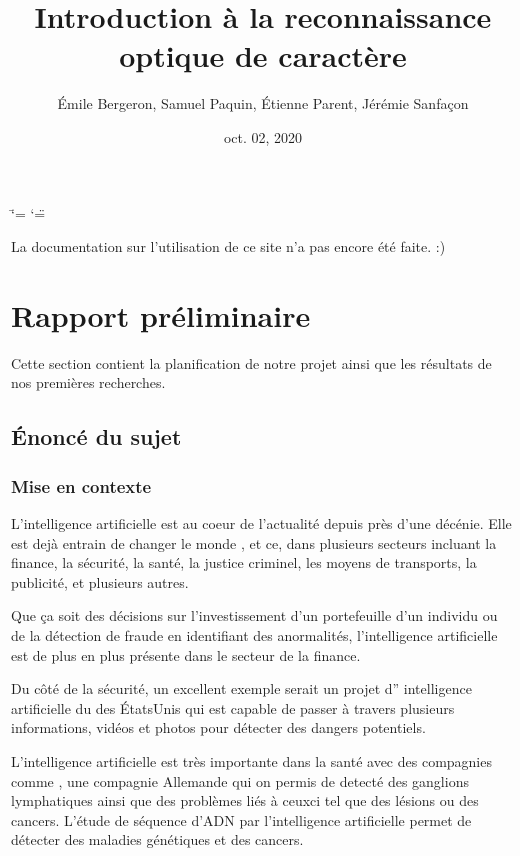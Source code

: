 \documentclass[letterpaper,10pt,french]{sphinxmanual}
\title{Introduction à la reconnaissance optique de caractère}
\date{oct. 02, 2020}
\author{Émile Bergeron, Samuel Paquin, Étienne Parent, Jérémie Sanfaçon}
\begin{document}
\ifdefined\shorthandoff
  \ifnum\catcode`\=\string=\active\shorthandoff{=}\fi
  \ifnum\catcode`\"=\active{}\fi
\fi

\pagestyle{empty}
\sphinxmaketitle
\pagestyle{plain}
\sphinxtableofcontents
\pagestyle{normal}
\label{\detokenize{intro::doc}}


La documentation sur l’utilisation de ce site n’a pas encore été faite. :)


\chapter{Rapport préliminaire}
\label{\detokenize{rapport_preliminaire:rapport-preliminaire}}\label{\detokenize{rapport_preliminaire::doc}}
Cette section contient la planification de notre projet ainsi que les
résultats de nos premières recherches.


\section{Énoncé du sujet}
\label{\detokenize{enonce_sujet:enonce-du-sujet}}\label{\detokenize{enonce_sujet::doc}}

\subsection{Mise en contexte}
\label{\detokenize{enonce_sujet:mise-en-contexte}}
L’intelligence artificielle est au coeur de l’actualité depuis près d’une
décénie. Elle est dejà entrain de changer le monde , et ce, dans plusieurs
secteurs incluant la finance, la sécurité, la santé, la justice criminel,
les moyens de transports, la publicité, et plusieurs autres.

Que ça soit des décisions sur l’investissement d’un portefeuille
d’un individu ou de la détection de fraude en identifiant des anormalités, l’intelligence
artificielle est de plus en plus présente dans le secteur de la finance.

Du côté de la
sécurité, un excellent exemple serait 
un projet d” intelligence artificielle du 
des États\sphinxhyphen{}Unis qui est capable de passer à travers plusieurs informations,
vidéos et photos pour détecter des dangers potentiels.

L’intelligence artificielle est très importante dans la santé avec des compagnies comme
, une compagnie Allemande qui on permis de detecté
des ganglions lymphatiques ainsi que des problèmes liés à ceux\sphinxhyphen{}ci tel que des lésions
ou des cancers. L’étude de séquence d’ADN par l’intelligence artificielle permet de détecter
des maladies génétiques et des cancers.
\end{document}
